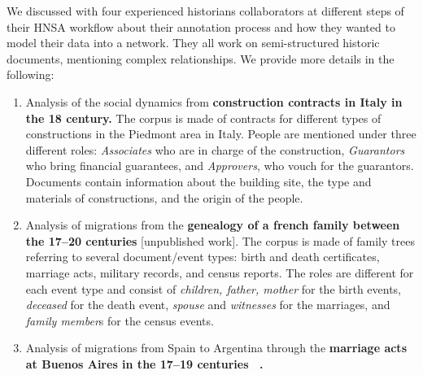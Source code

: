 We discussed with four experienced historians collaborators at different steps of their HNSA workflow about their annotation process and how they wanted to model their data into a network.
They all work on semi-structured historic documents, mentioning complex relationships.
We provide more details in the following:


\begin{enumerate}[nosep,leftmargin=*]
    \item Analysis of the social dynamics from \textbf{construction contracts in Italy in the 18 century\cite{Cristofoli2018, Rolla2018}.}
    The corpus is made of contracts for different types of constructions in the Piedmont area in Italy. People are mentioned under three different roles: \textit{Associates} who are in charge of the construction, \textit{Guarantors} who bring financial guarantees, and \textit{Approvers}, who vouch for the guarantors. Documents contain information about the building site, the type and materials of constructions, and the origin of the people.
    \item Analysis of migrations from the \textbf{genealogy of a french family between the 17--20 centuries} [unpublished work].
    The corpus is made of family trees referring to several document/event types: birth and death certificates, marriage acts, military records, and census reports.
    The roles are different for each event type and consist of \textit{children, father, mother} for the birth events, \textit{deceased} for the death event, \textit{spouse} and \textit{witnesses} for the marriages, and \textit{family member}s for the census events.
    \item Analysis of migrations from Spain to Argentina through the \textbf{marriage acts at Buenos Aires in the 17--19 centuries ~\cite{moutoukiasBuenosAiresPort2016, rueda1989matrimonios}.}

\end{enumerate}
